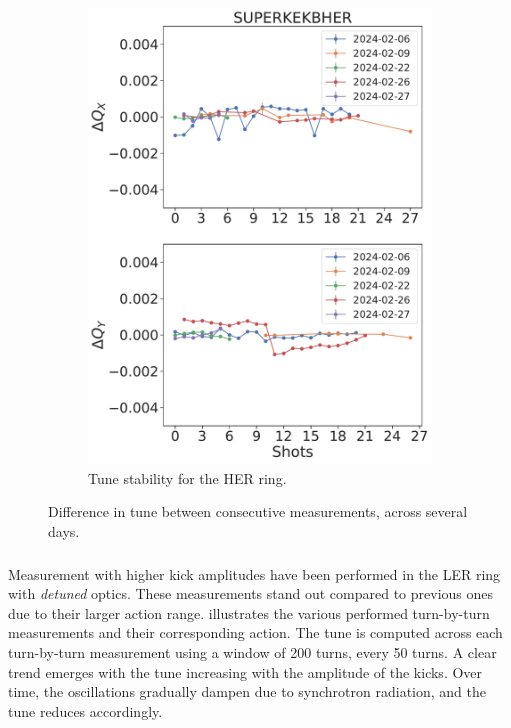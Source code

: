 \begin{figure}[!htb]
\begin{subfigure}[b]{0.48\textwidth}
        \includegraphics[width=\linewidth]{images/kek/SUPERKEKBHER_shots.pdf}
        \caption{Tune stability for the HER ring.}
    \end{subfigure}
    \caption{Difference in tune between consecutive measurements, across several days.}
    \label{fig:kek:shots}
\end{figure}


\FloatBarrier
\subsubsection{}

Measurement with higher kick amplitudes have been performed in the LER ring with \textit{detuned} optics.
These measurements stand out compared to previous ones due to their larger action range.
 illustrates the various performed turn-by-turn measurements and their corresponding
action.
The tune is computed across each turn-by-turn measurement using a window of 200 turns, every 50 turns. A clear trend 
emerges with the tune increasing with the amplitude of the kicks. Over time, the oscillations gradually
dampen due to synchrotron radiation, and the tune reduces accordingly.

